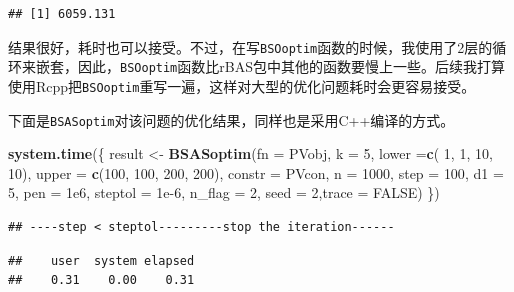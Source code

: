 \documentclass[]{ctexbook}
\newenvironment{Shaded}{\begin{snugshade}}{\end{snugshade}}
\newcommand{\KeywordTok}[1]{\textcolor[rgb]{0.13,0.29,0.53}{\textbf{#1}}}
\newcommand{\DataTypeTok}[1]{\textcolor[rgb]{0.13,0.29,0.53}{#1}}
\newcommand{\DecValTok}[1]{\textcolor[rgb]{0.00,0.00,0.81}{#1}}
\newcommand{\FloatTok}[1]{\textcolor[rgb]{0.00,0.00,0.81}{#1}}
\newcommand{\StringTok}[1]{\textcolor[rgb]{0.31,0.60,0.02}{#1}}
\newcommand{\OtherTok}[1]{\textcolor[rgb]{0.56,0.35,0.01}{#1}}
\newcommand{\OperatorTok}[1]{\textcolor[rgb]{0.81,0.36,0.00}{\textbf{#1}}}
\newcommand{\NormalTok}[1]{#1}
\theoremstyle{definition}
\theoremstyle{definition}
\theoremstyle{definition}
\theoremstyle{remark}
\begin{document}
\begin{verbatim}
## [1] 6059.131
\end{verbatim}

结果很好，耗时也可以接受。不过，在写\texttt{BSOoptim}函数的时候，我使用了2层的循环来嵌套，因此，\texttt{BSOoptim}函数比rBAS包中其他的函数要慢上一些。后续我打算使用Rcpp把\texttt{BSOoptim}重写一遍，这样对大型的优化问题耗时会更容易接受。

下面是\texttt{BSASoptim}对该问题的优化结果，同样也是采用C++编译的方式。

\begin{Shaded}
\begin{Highlighting}[]
\KeywordTok{system.time}\NormalTok{(\{}
\NormalTok{  result <-}\StringTok{ }\KeywordTok{BSASoptim}\NormalTok{(}\DataTypeTok{fn =}\NormalTok{ PVobj,}
                      \DataTypeTok{k =} \DecValTok{5}\NormalTok{,}
                      \DataTypeTok{lower =}\KeywordTok{c}\NormalTok{( }\DecValTok{1}\NormalTok{, }\DecValTok{1}\NormalTok{, }\DecValTok{10}\NormalTok{, }\DecValTok{10}\NormalTok{),}
                      \DataTypeTok{upper =} \KeywordTok{c}\NormalTok{(}\DecValTok{100}\NormalTok{, }\DecValTok{100}\NormalTok{, }\DecValTok{200}\NormalTok{, }\DecValTok{200}\NormalTok{),}
                      \DataTypeTok{constr =}\NormalTok{ PVcon,}
                      \DataTypeTok{n =} \DecValTok{1000}\NormalTok{,}
                      \DataTypeTok{step =} \DecValTok{100}\NormalTok{,}
                      \DataTypeTok{d1 =} \DecValTok{5}\NormalTok{,}
                      \DataTypeTok{pen =} \FloatTok{1e6}\NormalTok{,}
                      \DataTypeTok{steptol =} \FloatTok{1e-6}\NormalTok{,}
                      \DataTypeTok{n_flag =} \DecValTok{2}\NormalTok{,}
                      \DataTypeTok{seed =} \DecValTok{2}\NormalTok{,}\DataTypeTok{trace =} \OtherTok{FALSE}\NormalTok{)}
\NormalTok{\})}
\end{Highlighting}
\end{Shaded}

\begin{verbatim}
## ----step < steptol---------stop the iteration------
\end{verbatim}

\begin{verbatim}
##    user  system elapsed 
##    0.31    0.00    0.31
\end{verbatim}

\begin{Shaded}
\end{Shaded}
\end{document}
